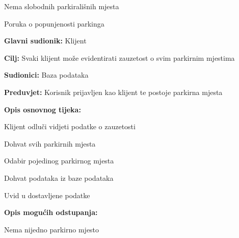\begin{packed_item}
\begin{packed_item}
\begin{packed_item}
    						\item[2.a] Nema slobodnih parkirališnih mjesta
    						\item[] \begin{packed_enum}
    							
    							\item Poruka o popunjenosti parkinga
    							
    						\end{packed_enum}
    						
    					\end{packed_item}
    				\end{packed_item}
    				\noindent {}
    				\begin{packed_item}
    					
    					\item \textbf{Glavni sudionik: } Klijent
    					\item  \textbf{Cilj:} Svaki klijent može evidentirati zauzetost o svim parkirnim mjestima
    					\item  \textbf{Sudionici:} Baza podataka
    					\item  \textbf{Preduvjet:} Korisnik prijavljen kao klijent te postoje parkirna mjesta
    					\item  \textbf{Opis osnovnog tijeka:}
    					
    					\item[] \begin{packed_enum}
    						
    						\item Klijent odluči vidjeti podatke o zauzetosti
    						\item Dohvat svih parkirnih mjesta
    						\item Odabir pojedinog parkirnog mjesta
    						\item Dohvat podataka iz baze podataka
    						\item Uvid u dostavljene podatke 
    					\end{packed_enum}
    					
    					\item  \textbf{Opis mogućih odstupanja:}
    					
    					\item[] \begin{packed_item}
    						
    						\item[2.a] Nema nijedno parkirno mjesto
    						\item[] \begin{packed_enum}
    							

\end{packed_enum}
\end{packed_item}
\end{packed_item}
\end{packed_item}
